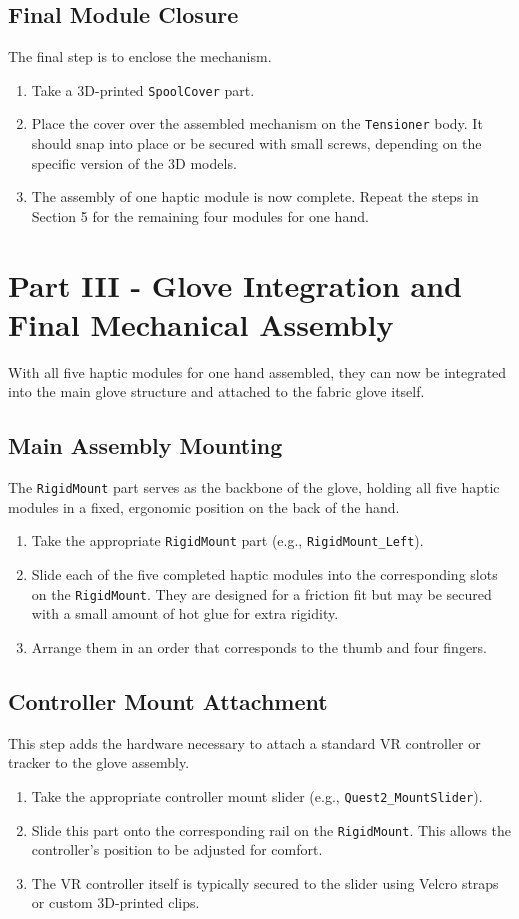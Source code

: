 \documentclass{article}
\begin{document}
\subsection{Final Module Closure}
The final step is to enclose the mechanism.
\begin{enumerate}
    \item Take a 3D-printed \texttt{SpoolCover} part.
    \item Place the cover over the assembled mechanism on the \texttt{Tensioner} body. It should snap into place or be secured with small screws, depending on the specific version of the 3D models.
    \item The assembly of one haptic module is now complete. Repeat the steps in Section 5 for the remaining four modules for one hand.
\end{enumerate}

\newpage
\section{Part III - Glove Integration and Final Mechanical Assembly}
With all five haptic modules for one hand assembled, they can now be integrated into the main glove structure and attached to the fabric glove itself.

\subsection{Main Assembly Mounting}
The \texttt{RigidMount} part serves as the backbone of the glove, holding all five haptic modules in a fixed, ergonomic position on the back of the hand.
\begin{enumerate}
    \item Take the appropriate \texttt{RigidMount} part (e.g., \texttt{RigidMount\_Left}).
    \item Slide each of the five completed haptic modules into the corresponding slots on the \texttt{RigidMount}. They are designed for a friction fit but may be secured with a small amount of hot glue for extra rigidity.
    \item Arrange them in an order that corresponds to the thumb and four fingers.
\end{enumerate}

\subsection{Controller Mount Attachment}
This step adds the hardware necessary to attach a standard VR controller or tracker to the glove assembly.
\begin{enumerate}
    \item Take the appropriate controller mount slider (e.g., \texttt{Quest2\_MountSlider}).
    \item Slide this part onto the corresponding rail on the \texttt{RigidMount}. This allows the controller's position to be adjusted for comfort.
    \item The VR controller itself is typically secured to the slider using Velcro straps or custom 3D-printed clips.
\end{enumerate}
\end{document}
